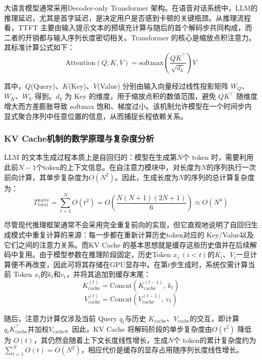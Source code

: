 \documentclass[UTF8,a4paper,zihao=5]{ctexart}
\begin{document}
大语言模型通常采用Decoder-only Transformer 架构。在语音对话系统中，LLM的推理延迟，尤其是首字延迟，是决定用户是否感到卡顿的关键瓶颈。从推理流程看，TTFT 主要由输入提示文本的预填充计算与随后的首个解码步共同构成，而二者的开销都与输入序列长度密切相关。Transformer 的核心是缩放点积注意力。其标准计算公式如下：
\begin{equation}
\mathrm{Attention}(Q,K,V)=\mathrm{softmax}\!\left(\frac{QK^{\top}}{\sqrt{d_k}}\right)V
\end{equation}

其中，$Q$(Query)、$K$(Key)、$V$(Value) 分别由输入向量经过线性投影矩阵 $W_Q$、$W_K$、$W_V$ 得到。$d_k$ 为 Key 的维度，用于缩放点积的数值范围，避免 $QK^{\top}$ 随维度增大而方差膨胀导致 softmax 饱和、梯度过小。该机制允许模型在一个时间步内显式聚合序列中任意位置的信息，从而捕捉长程依赖关系。

\subsubsection{KV Cache机制的数学原理与复杂度分析}

LLM 的文本生成过程本质上是自回归的：模型在生成第$N$个 token 时，需要利用此前$N-1$个token的上下文信息。在自注意力模块中，对长度为$N$的序列执行一次前向计算，其单步复杂度为$O(N^{2})$。因此，生成长度为$N$的序列的总计算复杂度为：
\begin{equation}
T_{\mathrm{total}}^{\mathrm{naive}}=\sum_{t=1}^{N}O(t^{2})=O\!\left(\frac{N(N+1)(2N+1)}{6}\right)\approx O(N^{3})
\end{equation}

尽管现代推理框架通常不会采用完全重复前向的实现，但它直观地说明了自回归生成模式中重复计算的来源：每一步都在重新计算历史token对应的 Key/Value以及它们之间的注意力关系。而KV Cache 的基本思想就是缓存这些历史值并在后续解码中复用。由于模型参数在推理阶段固定，历史Token $x_i\ (i<t)$的$K_i$、$V_i$一旦计算便不再改变，因此可将其存储在GPU显存中。在第$t$步生成时，系统仅需计算当前 Token $x_t$的$k_t$和$v_t$，并将其追加到缓存末尾：
\begin{equation}
K_{\mathrm{cache}}^{(t)}=\mathrm{Concat}\left(K_{\mathrm{cache}}^{(t-1)},\,k_t\right)
\end{equation}
\begin{equation}
V_{\mathrm{cache}}^{(t)}=\mathrm{Concat}\left(V_{\mathrm{cache}}^{(t-1)},\,v_t\right)
\end{equation}

随后，注意力计算仅涉及当前 Query $q_t$与历史 $K_{\mathrm{cache}}$、$V_{\mathrm{cache}}$的交互，即计算$q_t K_{\mathrm{cache}}^{\top}$并加权$V_{\mathrm{cache}}$。因此，KV Cache 将解码阶段的单步复杂度由$O(t^{2})$ 降低为 $O(t)$，其仍然会随着上下文长度线性增长，生成$N$个 token的累计复杂度约为$\sum_{t=1}^{N}O(t)=O(N^{2})$，相应代价是缓存的显存占用随序列长度线性增长。
\end{document}
